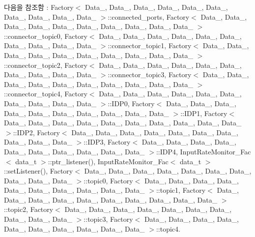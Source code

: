 다음을 참조함 \+:  Factory$<$ Data\+\_, Data\+\_, Data\+\_, Data\+\_, Data\+\_, Data\+\_, Data\+\_, Data\+\_, Data\+\_, Data\+\_ $>$\+::connected\+\_\+ports, Factory$<$ Data\+\_, Data\+\_, Data\+\_, Data\+\_, Data\+\_, Data\+\_, Data\+\_, Data\+\_, Data\+\_, Data\+\_ $>$\+::connector\+\_\+topic0, Factory$<$ Data\+\_, Data\+\_, Data\+\_, Data\+\_, Data\+\_, Data\+\_, Data\+\_, Data\+\_, Data\+\_, Data\+\_ $>$\+::connector\+\_\+topic1, Factory$<$ Data\+\_, Data\+\_, Data\+\_, Data\+\_, Data\+\_, Data\+\_, Data\+\_, Data\+\_, Data\+\_, Data\+\_ $>$\+::connector\+\_\+topic2, Factory$<$ Data\+\_, Data\+\_, Data\+\_, Data\+\_, Data\+\_, Data\+\_, Data\+\_, Data\+\_, Data\+\_, Data\+\_ $>$\+::connector\+\_\+topic3, Factory$<$ Data\+\_, Data\+\_, Data\+\_, Data\+\_, Data\+\_, Data\+\_, Data\+\_, Data\+\_, Data\+\_, Data\+\_ $>$\+::connector\+\_\+topic4, Factory$<$ Data\+\_, Data\+\_, Data\+\_, Data\+\_, Data\+\_, Data\+\_, Data\+\_, Data\+\_, Data\+\_, Data\+\_ $>$\+::\+I\+D\+P0, Factory$<$ Data\+\_, Data\+\_, Data\+\_, Data\+\_, Data\+\_, Data\+\_, Data\+\_, Data\+\_, Data\+\_, Data\+\_ $>$\+::\+I\+D\+P1, Factory$<$ Data\+\_, Data\+\_, Data\+\_, Data\+\_, Data\+\_, Data\+\_, Data\+\_, Data\+\_, Data\+\_, Data\+\_ $>$\+::\+I\+D\+P2, Factory$<$ Data\+\_, Data\+\_, Data\+\_, Data\+\_, Data\+\_, Data\+\_, Data\+\_, Data\+\_, Data\+\_, Data\+\_ $>$\+::\+I\+D\+P3, Factory$<$ Data\+\_, Data\+\_, Data\+\_, Data\+\_, Data\+\_, Data\+\_, Data\+\_, Data\+\_, Data\+\_, Data\+\_ $>$\+::\+I\+D\+P4, Input\+Rate\+Monitor\+\_\+\+Fac$<$ data\+\_\+t $>$\+::ptr\+\_\+listener(), Input\+Rate\+Monitor\+\_\+\+Fac$<$ data\+\_\+t $>$\+::set\+Listener(), Factory$<$ Data\+\_, Data\+\_, Data\+\_, Data\+\_, Data\+\_, Data\+\_, Data\+\_, Data\+\_, Data\+\_, Data\+\_ $>$\+::topic0, Factory$<$ Data\+\_, Data\+\_, Data\+\_, Data\+\_, Data\+\_, Data\+\_, Data\+\_, Data\+\_, Data\+\_, Data\+\_ $>$\+::topic1, Factory$<$ Data\+\_, Data\+\_, Data\+\_, Data\+\_, Data\+\_, Data\+\_, Data\+\_, Data\+\_, Data\+\_, Data\+\_ $>$\+::topic2, Factory$<$ Data\+\_, Data\+\_, Data\+\_, Data\+\_, Data\+\_, Data\+\_, Data\+\_, Data\+\_, Data\+\_, Data\+\_ $>$\+::topic3, Factory$<$ Data\+\_, Data\+\_, Data\+\_, Data\+\_, Data\+\_, Data\+\_, Data\+\_, Data\+\_, Data\+\_, Data\+\_ $>$\+::topic4.



